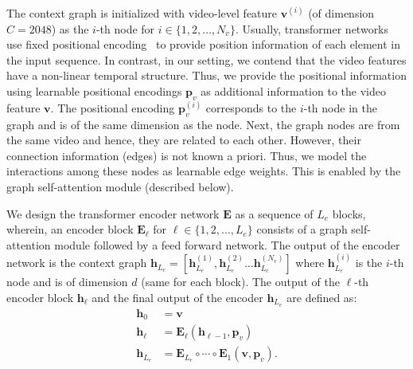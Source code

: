\documentclass[10pt,twocolumn,letterpaper]{article}
\begin{document}
The context graph is initialized with video-level feature $\mathbf{v}^{(i)}$ (of dimension $C=2048$) as the $i$-th node for $i \in \{1,2,\ldots,N_v\}$. Usually, transformer networks use fixed positional encoding~\cite{parmar2018image} to provide position information of each element in the input sequence. In contrast, in our setting, we contend that the video features have a non-linear temporal structure.
Thus, we provide the positional information using learnable positional encodings $\mathbf{p}_{v}$ as additional information to the video feature $\mathbf{v}$. The positional encoding $\mathbf{p}_{v}^{(i)}$ corresponds to the $i$-th node in the graph and is of the same dimension as the node.
Next, the graph nodes are from the same video and hence, they are related to each other. However, their connection information (edges) is not known a priori. Thus, we model the interactions among these nodes as learnable edge weights. This is enabled by the graph self-attention module (described below). 

We design the transformer encoder network $\mathbf{E}$ as a sequence of $L_e$ blocks, wherein, an  encoder block $\mathbf{E}_\ell$ for $\ell \in \{1,2,\ldots,L_{e}\}$ consists of a graph self-attention module  followed by a feed forward network. 
The output of the encoder network is the context graph $\mathbf{h}_{L_e} = [\mathbf{h}^{(1)}_{L_e}, \mathbf{h}^{(2)}_{L_e} \ldots \mathbf{h}^{(N_v)}_{L_e}]$ where $\mathbf{h}^{(i)}_{L_e}$ is the $i$-th node and is of dimension $d$ (same for each block). The output of the $\ell$-th encoder block $\mathbf{h}_{\ell}$ and the final output of the encoder $\mathbf{h}_{L_e}$ are defined as:
\begin{equation}
\label{eq:enc}
\begin{split}
    \mathbf{h}_{0} &= \mathbf{v}\\
    \mathbf{h}_{\ell} &= \mathbf{E}_{\ell}(\mathbf{h}_{\ell-1},\mathbf{p}_{v}) \\
    \mathbf{h}_{L_e} &= \mathbf{E}_{L_{e}} \circ \cdots \circ \mathbf{E}_{1} (\mathbf{v},\mathbf{p}_{v}).
\end{split}
\end{equation}
\end{document}
